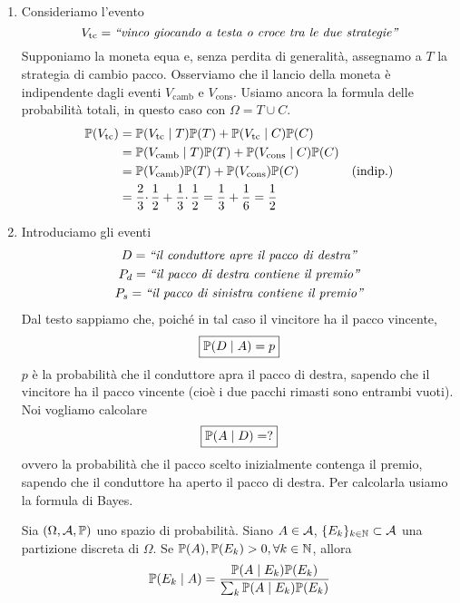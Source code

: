 \begin{enumerate}
	\item Consideriamo l'evento
	\begin{equation*}
		V_{\text{tc}} =\emph{``vinco giocando a testa o croce tra le due strategie''}
	\end{equation*}
	Supponiamo la moneta equa e, senza perdita di generalità, assegnamo a $T$ la strategia di cambio pacco. Osserviamo che il lancio della moneta è indipendente dagli eventi $V_{\text{camb}}$ e $V_{\text{cons}}$. Usiamo ancora la formula delle probabilità totali, in questo caso con $\Omega =T\cup C$.
	\begin{align*}
		\mathbb{P}(V_{\text{tc}}) & =\mathbb{P}(V_{\text{tc}} \mid T)\mathbb{P}(T) +\mathbb{P}(V_{\text{tc}} \mid C)\mathbb{P}(C) & \\
		 & =\mathbb{P}(V_{\text{camb}} \mid T)\mathbb{P}(T) +\mathbb{P}(V_{\text{cons}} \mid C)\mathbb{P}(C) & \\
		 & =\mathbb{P}(V_{\text{camb}})\mathbb{P}(T) +\mathbb{P}(V_{\text{cons}})\mathbb{P}(C) & \text{(indip.)}\\
		 & =\frac{2}{3} \cdotp \frac{1}{2} +\frac{1}{3} \cdotp \frac{1}{2} =\frac{1}{3} +\frac{1}{6} =\frac{1}{2} & 
	\end{align*}
	\item Introduciamo gli eventi
	\begin{gather*}
		D=\emph{``il conduttore apre il pacco di destra''}\\
		P_{d} =\emph{``il pacco di destra contiene il premio''}\\
		P_{s} =\emph{``il pacco di sinistra contiene il premio''}
	\end{gather*}
	Dal testo sappiamo che, poiché in tal caso il vincitore ha il pacco vincente,
	\begin{equation*}
		\boxed{\mathbb{P}(D\mid A) =p}
	\end{equation*}
	$p$ è la probabilità che il conduttore apra il pacco di destra, sapendo che il vincitore ha il pacco vincente (cioè i due pacchi rimasti sono entrambi vuoti). Noi vogliamo calcolare
	\begin{equation*}
		\boxed{\mathbb{P}(A\mid D) =?}
	\end{equation*}
	ovvero la probabilità che il pacco scelto inizialmente contenga il premio, sapendo che il conduttore ha aperto il pacco di destra. Per calcolarla usiamo la formula di Bayes.
	\begin{theorem}
		Sia $(\Omega,\mathcal{A},\mathbb{P})$ uno spazio di probabilità. Siano $A\in \mathcal{A}$, $\{E_{k}\}_{k\in \mathbb{N}} \subset \mathcal{A}$ una partizione discreta di $\Omega $. Se $\mathbb{P}(A) ,\mathbb{P}(E_{k})  >0,\forall k\in \mathbb{N}$, allora
		\begin{equation*}
			\mathbb{P}(E_{k} \mid A) =\frac{\mathbb{P}(A\mid E_{k})\mathbb{P}(E_{k})}{\sum_{k}\mathbb{P}(A\mid E_{k})\mathbb{P}(E_{k})}
		\end{equation*}
	\end{theorem}


\end{enumerate}
